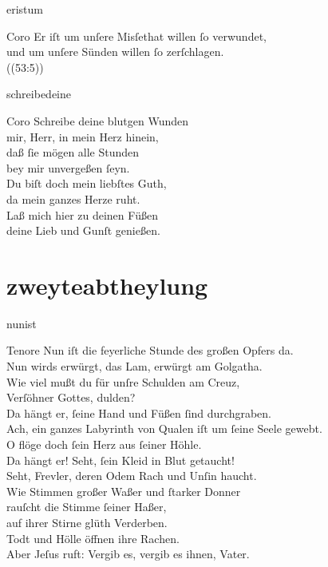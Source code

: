 \documentclass[shorttitlesize=55,tocstyle=ref-genre]{ees}
\begin{document}
{\begin{movement}{eristum}
  \item[Coro]
  Er iſt um unſere Misſethat willen ſo verwundet,\\
  und um unſere Sünden willen ſo zerſchlagen.\\
  ((53:5))
\end{movement}

\begin{movement}{schreibedeine}
  \item[Coro]
  Schreibe deine blutgen Wunden\\
  mir, Herr, in mein Herz hinein,\\
  daß ſie mögen alle Stunden\\
  bey mir unvergeßen ſeyn.\\
  Du biſt doch mein liebſtes Guth,\\
  da mein ganzes Herze ruht.\\
  Laß mich hier zu deinen Füßen\\
  deine Lieb und Gunſt genießen.
\end{movement}

\part{zweyteabtheylung}

\begin{movement}{nunist}
  \item[Tenore]
  Nun iſt die feyerliche Stunde des großen Opfers da.\\
  Nun wirds erwürgt, das Lam, erwürgt am Golgatha.\\
  Wie viel mußt du für unſre Schulden am Creuz,\\
  Verſöhner Gottes, dulden?\\
  Da hängt er, ſeine Hand und Füßen ſind durchgraben.\\
  Ach, ein ganzes Labyrinth von Qualen iſt um ſeine Seele gewebt.\\
  O flöge doch ſein Herz aus ſeiner Höhle.\\
  Da hängt er! Seht, ſein Kleid in Blut getaucht!\\
  Seht, Frevler, deren Odem Rach und Unſin haucht.\\
  Wie Stimmen großer Waßer und ſtarker Donner\\
  rauſcht die Stimme ſeiner Haßer,\\
  auf ihrer Stirne glüth Verderben.\\
  Todt und Hölle öffnen ihre Rachen.\\
  Aber Jeſus ruft: Vergib es, vergib es ihnen, Vater.
\end{movement}

}
\end{document}
